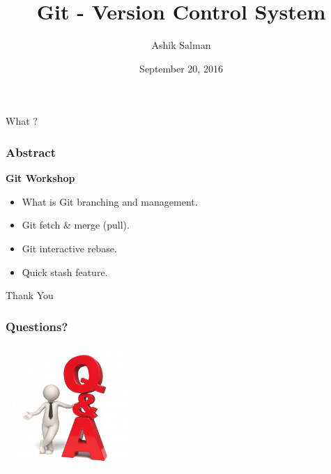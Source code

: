 \documentclass[10pt]{beamer}
\title{Git - Version Control System}
\author{Ashik Salman}
\institute[UMBC]{Intermediary Workshop \\
  ..... \\
  Backend Developer \\
  Chillr, Backwater Technologies \\
  Kochi, Kerala \\

}
\date{September 20, 2016}
\begin{document}

\begin{frame}[plain]
  \titlepage
\end{frame}
	
\begin{frame}
  \begin{center}
    \Huge{What ?}
  \end{center}
\end{frame}

\begin{frame}
  \frametitle{Abstract}
  \textbf{Git Workshop}
  \medskip
  \begin{itemize}
    \item What is Git branching and management.
    \item Git fetch \& merge (pull).
    \item Git interactive rebase.
    \item Quick stash feature.
  \end{itemize}
\end{frame}

\begin{frame}
  \begin{center}
    \Huge{Thank You}
  \end{center}
\end{frame}

\begin{frame}
	\frametitle{Questions?}
	\begin{center}
	\includegraphics[width=0.35\textwidth]{q2.jpg}
	\end{center}
\end{frame}

\end{document}

